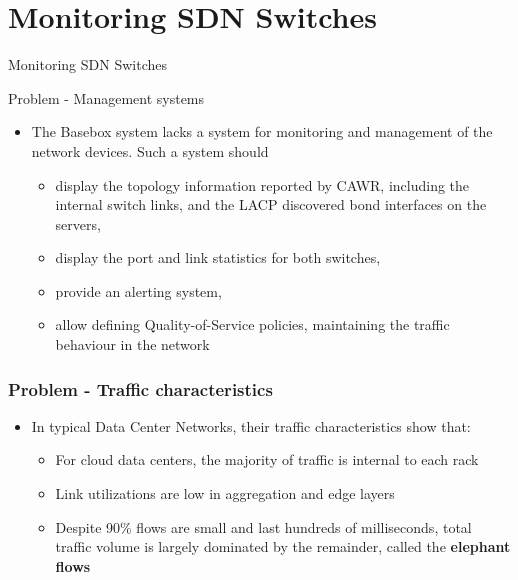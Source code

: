 \documentclass[aspectratio=43]{beamer}
\begin{document}
\section{Monitoring SDN Switches}
\begin{frame}[plain]
    \centering
        \Huge{Monitoring SDN Switches}
\end{frame}

\begin{frame}{Problem - Management systems}
\begin{itemize}
    \item<1->The Basebox system lacks a system for monitoring and management of the network devices. Such a system should 
    \begin{itemize}
        \item<2-> display the topology information reported by CAWR, including the internal switch links, and the LACP discovered bond interfaces on the servers,
        \item<3-> display the port and link statistics for both switches,
        \item<4-> provide an alerting system, 
        \item<5-> allow defining Quality-of-Service policies, maintaining the traffic behaviour in the network
    \end{itemize}
\end{itemize}
\end{frame}

\begin{frame}
\frametitle{Problem - Traffic characteristics}
\begin{itemize}
    \item<1->In typical Data Center Networks, their traffic characteristics show that:
    \begin{itemize}
        \item<2->For cloud data centers, the majority of traffic is internal to each rack
        \item<3->Link utilizations are low in aggregation and edge layers
        \item<4->Despite 90\% flows are small and last hundreds of milliseconds, total traffic volume is largely dominated by the remainder, called the
            \textbf{elephant flows}
    \end{itemize}
\end{itemize}
\end{frame}
\end{document}
